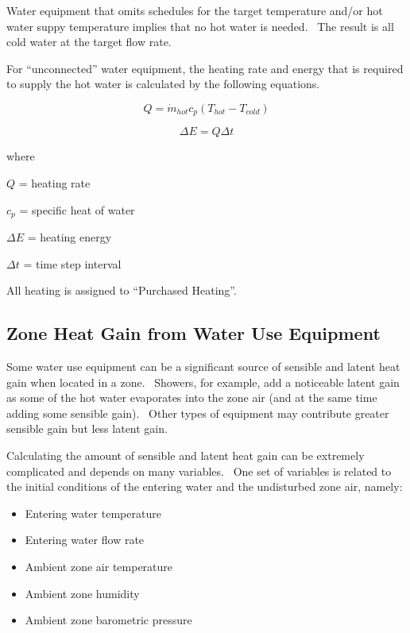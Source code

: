 Water equipment that omits schedules for the target temperature and/or hot water suppy temperature implies that no hot water is needed.~ The result is all cold water at the target flow rate.

For ``unconnected'' water equipment, the heating rate and energy that is required to supply the hot water is calculated by the following equations.

\begin{equation}
Q = {\dot m_{hot}}{c_p}\left( {{T_{hot}} - {T_{cold}}} \right)
\end{equation}

\begin{equation}
\Delta E = Q\Delta t
\end{equation}

where

\(Q\) = heating rate

\({c_p}\) = specific heat of water

\(\Delta E\) = heating energy

\(\Delta t\) = time step interval

All heating is assigned to ``Purchased Heating''.

\subsection{Zone Heat Gain from Water Use Equipment}\label{zone-heat-gain-from-water-use-equipment}

Some water use equipment can be a significant source of sensible and latent heat gain when located in a zone.~ Showers, for example, add a noticeable latent gain as some of the hot water evaporates into the zone air (and at the same time adding some sensible gain).~ Other types of equipment may contribute greater sensible gain but less latent gain.

Calculating the amount of sensible and latent heat gain can be extremely complicated and depends on many variables.~ One set of variables is related to the initial conditions of the entering water and the undisturbed zone air, namely:

\begin{itemize}
\item
  Entering water temperature
\item
  Entering water flow rate
\item
  Ambient zone air temperature
\item
  Ambient zone humidity
\item
  Ambient zone barometric pressure
\end{itemize}

